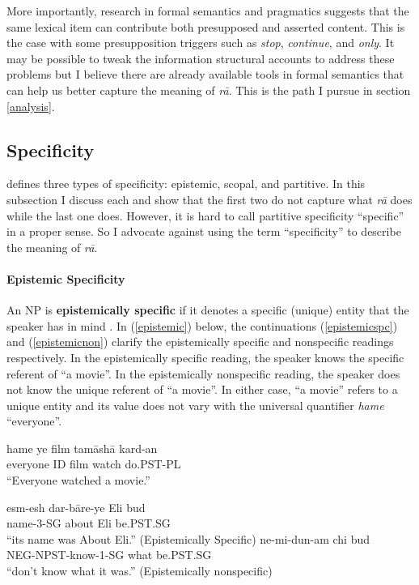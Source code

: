 \documentclass[12pt]{article}
\begin{document}
More importantly, research in formal semantics and pragmatics suggests that the same lexical item can contribute both presupposed and asserted content. This is the case with some presupposition triggers such as \emph{stop}, \emph{continue}, and \emph{only}. It may be possible to tweak the information structural accounts to address these problems but I believe there are already available tools in formal semantics that can help us better capture the meaning of \emph{r\={a}}. This is the path I pursue in section \ref{analysis}.

\subsection {Specificity}

\citet{farkas1994specificity} defines three types of specificity: epistemic, scopal, and partitive. In this subsection I discuss each and show that the first two do not capture what \emph{r\={a}} does while the last one does. However, it is hard to call partitive specificity ``specific'' in a proper sense. So I advocate against using the term ``specificity'' to describe the meaning of \emph{r\={a}}.

\paragraph{Epistemic Specificity} An NP is \textbf{epistemically specific} if it denotes a specific (unique) entity that the speaker has in mind \citep{fodor1982referential}. In (\ref{epistemic}) below, the continuations (\ref {epistemicspc}) and (\ref {epistemicnon}) clarify the epistemically specific and nonspecific readings respectively. In the epistemically specific reading, the speaker knows the specific referent of ``a movie''. In the epistemically nonspecific reading, the speaker does not know the unique referent of ``a movie''. In either case, ``a movie'' refers to a unique entity and its value does not vary with the universal quantifier \emph{hame} ``everyone''.

	\begin {exe}
		\ex	\label {epistemic} \gll	hame	ye film	tam\={a}sh\={a} kard-an\\
    			everyone {\scriptsize ID}	film watch	do{\scriptsize .PST-PL}\\
    		\glt 	``Everyone watched a movie.'' \begin {xlist}
			\ex \label {epistemicspc} \gll	esm-esh 	dar-b\={a}re-ye	Eli	bud\\
    			name-{\scriptsize 3-SG}	about Eli		be{\scriptsize .PST.SG}\\
    		\glt 	``its name was About Eli.'' (Epistemically Specific)
			\ex \label {epistemicnon} \gll	ne-mi-dun-am	chi bud\\
    			{\scriptsize NEG-NPST}-know-{\scriptsize 1-SG}	what be{\scriptsize .PST.SG}\\
    		\glt 	``don't know what it was.'' (Epistemically nonspecific)		\end {xlist}
	\end {exe}
	
\end{document}

